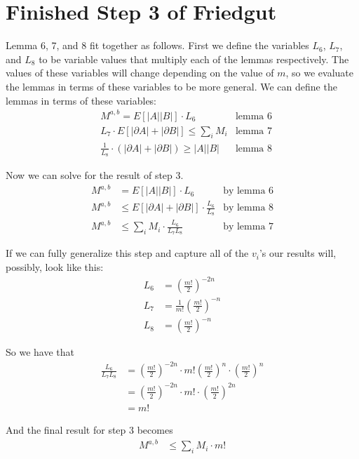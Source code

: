 \section{Finished Step 3 of Friedgut}

	Lemma 6, 7, and 8 fit together as follows. First we define the variables $L_6$, $L_7$, and $L_8$ to be variable values that multiply each of the lemmas respectively. The values of these variables will change depending on the value of $m$, so we evaluate the lemmas in terms of these variables to be more general. We can define the lemmas in terms of these variables:
	\begin{align*}
		&M^{a,b} = E[|A||B|] \cdot L_6 & \textrm{lemma 6} \\
		&L_7 \cdot E[|\partial A| + |\partial B|] \le \sum_i M_i & \textrm{lemma 7} \\
		&\frac{1}{L_8} \cdot (|\partial A| + |\partial B|) \ge |A||B| & \textrm{lemma 8}
	\end{align*}

	Now we can solve for the result of step 3.
	\begin{align*}
		M^{a,b} &= E[|A||B|] \cdot L_6 & \textrm{by lemma 6} \\
		M^{a,b} &\le E[|\partial A| + |\partial B|] \cdot \frac{L_6}{L_8} & \textrm{by lemma 8} \\
		M^{a,b} &\le \sum_i M_i \cdot \frac{L_6}{L_7L_8} & \textrm{by lemma 7}
	\end{align*}

	If we can fully generalize this step and capture all of the $v_i$'s our results will, possibly, look like this:
	\begin{align*}
		L_6 &= \left(\frac{m!}{2}\right)^{-2n} \\
		L_7 &= \frac{1}{m!}\left(\frac{m!}{2}\right)^{-n} \\
		L_8 &= \left(\frac{m!}{2}\right)^{-n}
	\end{align*}

	So we have that
	\begin{align*}
		\frac{L_6}{L_7L_8} &= \left(\frac{m!}{2}\right)^{-2n} \cdot m!\left(\frac{m!}{2}\right)^{n} \cdot \left(\frac{m!}{2}\right)^{n} \\
		&= \left(\frac{m!}{2}\right)^{-2n} \cdot m! \cdot \left(\frac{m!}{2}\right)^{2n} \\
		&= m!
	\end{align*}

	And the final result for step 3 becomes
	\begin{align*}
		M^{a,b} &\le \sum_i M_i \cdot m!
	\end{align*}

